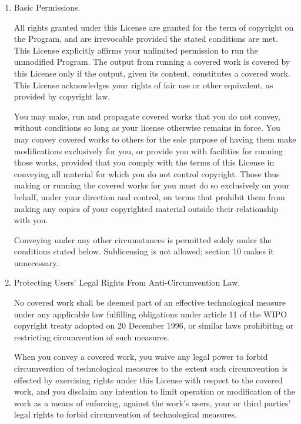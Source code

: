 \documentclass[10pt,a4paper,ngerman,titlepage,tocindentauto]{article}
\begin{document}
\begin{multicols}{3}
{\begin{enumerate}
						The Corresponding Source need not include anything that users
						can regenerate automatically from other parts of the Corresponding
						Source.

						The Corresponding Source for a work in source code form is that
						same work.

						\item Basic Permissions.

						All rights granted under this License are granted for the term of
						copyright on the Program, and are irrevocable provided the stated
						conditions are met.  This License explicitly affirms your unlimited
						permission to run the unmodified Program.  The output from running a
						covered work is covered by this License only if the output, given its
						content, constitutes a covered work.  This License acknowledges your
						rights of fair use or other equivalent, as provided by copyright law.

						You may make, run and propagate covered works that you do not
						convey, without conditions so long as your license otherwise remains
						in force.  You may convey covered works to others for the sole purpose
						of having them make modifications exclusively for you, or provide you
						with facilities for running those works, provided that you comply with
						the terms of this License in conveying all material for which you do
						not control copyright.  Those thus making or running the covered works
						for you must do so exclusively on your behalf, under your direction
						and control, on terms that prohibit them from making any copies of
						your copyrighted material outside their relationship with you.

						Conveying under any other circumstances is permitted solely under
						the conditions stated below.  Sublicensing is not allowed; section 10
						makes it unnecessary.

						\item Protecting Users' Legal Rights From Anti-Circumvention Law.

						No covered work shall be deemed part of an effective technological
						measure under any applicable law fulfilling obligations under article
						11 of the WIPO copyright treaty adopted on 20 December 1996, or
						similar laws prohibiting or restricting circumvention of such
						measures.

						When you convey a covered work, you waive any legal power to forbid
						circumvention of technological measures to the extent such circumvention
						is effected by exercising rights under this License with respect to
						the covered work, and you disclaim any intention to limit operation or
						modification of the work as a means of enforcing, against the work's
						users, your or third parties' legal rights to forbid circumvention of
						technological measures.


\end{enumerate}}
\end{multicols}
\end{document}
